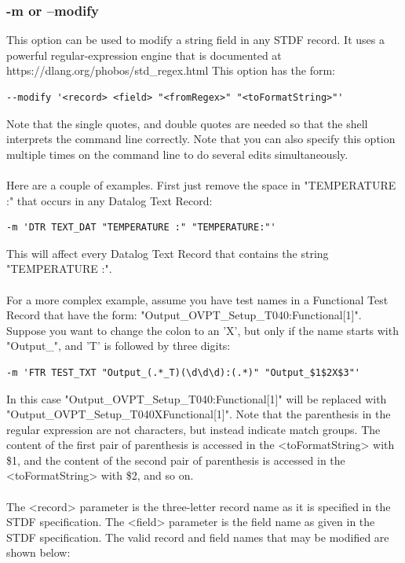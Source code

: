 \documentclass[letterpaper]{article}
\begin{document}
\subsubsection{\bf -m or --modify}
This option can be used to modify a string field in any STDF record. It uses a powerful
regular-expression engine that is documented at https://dlang.org/phobos/std\_regex.html
This option has the form:
\begin{verbatim}
--modify '<record> <field> "<fromRegex>" "<toFormatString>"'
\end{verbatim}
Note that the single quotes, and double quotes are needed so that the shell
interprets the command line correctly.  Note that you can also specify this
option multiple times on the command line to do several edits simultaneously.
\\
\\
Here are a couple of examples.  First just remove the space in "TEMPERATURE :"
that occurs in any Datalog Text Record:
\begin{verbatim}
-m 'DTR TEXT_DAT "TEMPERATURE :" "TEMPERATURE:"'
\end{verbatim}
This will affect every Datalog Text Record that contains the string "TEMPERATURE :".\\
\\
For a more complex example, assume you have test names in a Functional Test Record
that have the form: "Output\_OVPT\_Setup\_T040:Functional[1]". Suppose you want to change
the colon to an 'X', but only if the name starts with "Output\_", and 'T' is followed by three digits:
\begin{verbatim}
-m 'FTR TEST_TXT "Output_(.*_T)(\d\d\d):(.*)" "Output_$1$2X$3"'
\end{verbatim}
In this case "Output\_OVPT\_Setup\_T040:Functional[1]" will be replaced with "Output\_OVPT\_Setup\_T040XFunctional[1]".
Note that the parenthesis in the regular expression are not characters, but instead indicate match groups.
The content of the first pair of parenthesis is accessed in the <toFormatString> with \$1, and the content
of the second pair of parenthesis is accessed in the <toFormatString> with \$2, and so on.
\\
\\
\noindent
The <record> parameter is the three-letter record name as it is specified
in the STDF specification.  The <field> parameter is the field name as
given in the STDF specification.  The valid record and field names
that may be modified are shown below:
\end{document}
